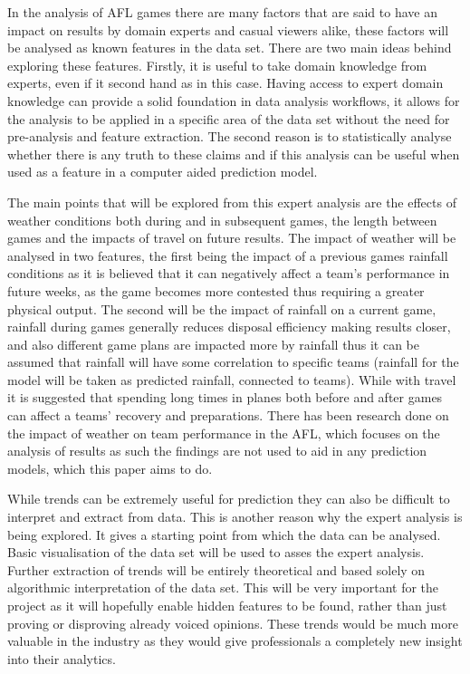 \documentclass{imc-inf}
\begin{document}
	In the analysis of AFL games there are many factors that are said to have an impact on results by domain experts and casual viewers alike, these factors will be analysed as known features in the data set. There are two main ideas behind exploring these features. Firstly, it is useful to take domain knowledge from experts, even if it second hand as in this case. Having access to expert domain knowledge can provide a solid foundation in data analysis workflows, it allows for the analysis to be applied in a specific area of the data set without the need for pre-analysis and feature extraction. The second reason is to statistically analyse whether there is any truth to these claims and if this analysis can be useful when used as a feature in a computer aided prediction model.
	\newline 
	
	The main points that will be explored from this expert analysis are the effects of weather conditions both during and in subsequent games, the length between games and the impacts of travel on future results. The impact of weather will be analysed in two features, the first being the impact of a previous games rainfall conditions as it is believed that it can negatively affect a team’s performance in future weeks, as the game becomes more contested thus requiring a greater physical output. The second will be the impact of rainfall on a current game, rainfall during games generally reduces disposal efficiency making results closer, and also different game plans are impacted more by rainfall thus it can be assumed that rainfall will have some correlation to specific teams (rainfall for the model will be taken as predicted rainfall, connected to teams). While with travel it is suggested that spending long times in planes both before and after games can affect a teams’ recovery and preparations. There has been research done on the impact of weather on team performance in the AFL\cite{website:AFL_Weather}, which focuses on the analysis of results as such the findings are not used to aid in any prediction models, which this paper aims to do.
	\newline
	
	While trends can be extremely useful for prediction they can also be difficult to interpret and extract from data. This is another reason why the expert analysis is being explored. It gives a starting point from which the data can be analysed. Basic visualisation of the data set will be used to asses the expert analysis. Further extraction of trends will be entirely theoretical and based solely on algorithmic interpretation of the data set. This will be very important for the project as it will hopefully enable hidden features to be found, rather than just proving or disproving already voiced opinions. These trends would be much more valuable in the industry as they would give professionals a completely new insight into their analytics.
	
\end{document}

